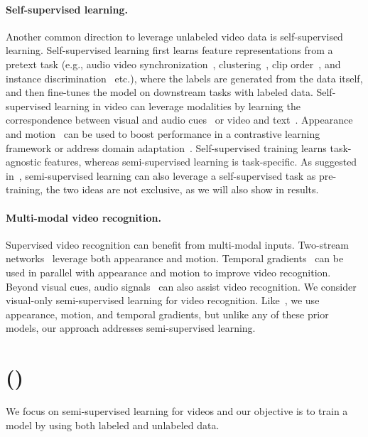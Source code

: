 \documentclass[10pt,twocolumn,letterpaper]{article}
\begin{document}
\paragraph{Self-supervised learning.} Another common direction to leverage unlabeled video data is self-supervised learning. Self-supervised learning first learns feature representations from a pretext task (e.g., 
audio video synchronization~\cite{korbar2018cooperative},  clustering~\cite{alwassel2019self}, clip order~\cite{xu2019self}, and instance discrimination~\cite{qian2020spatiotemporal} etc.), where the labels are generated from the data itself, and then fine-tunes the model on downstream tasks with labeled data. 
Self-supervised learning in video can leverage modalities by learning the correspondence between visual and audio cues~\cite{patrick2020multi} or video and text~\cite{zhu2020actbert, miech2020end}. Appearance and motion~\cite{Han20} can be used to boost performance in a contrastive learning framework or address domain adaptation~\cite{munro20multi}. 
Self-supervised training learns task-agnostic features, whereas semi-supervised learning is task-specific.
As suggested in~\cite{zeng2017semi}, semi-supervised learning can also leverage a self-supervised task as pre-training, {\ie the two ideas are not exclusive, as we will also show in results.} 




\paragraph{Multi-modal video recognition.} 
{Supervised} video recognition can benefit from multi-modal inputs. Two-stream networks~\cite{simonyan2014two, feichtenhofer2016convolutional} leverage both appearance and motion. 
Temporal gradients~\cite{wang2016temporal,zhao2018recognize} can be used in parallel with appearance and motion to improve video recognition.
{Beyond} visual cues, audio signals~\cite{xiao2020audiovisual,kazakos2019epic} can also assist video recognition. We consider visual-only semi-supervised learning for video recognition. Like~\cite{wang2016temporal,zhao2018recognize}, we  use appearance, motion, and temporal gradients, {but unlike any of these prior models, our approach addresses semi-supervised learning.}  


\section{\OURS (\oursshort)}\label{sec:approach}
We focus on semi-supervised learning for videos and our objective is to train a model by using both labeled and unlabeled data. 
\end{document}
